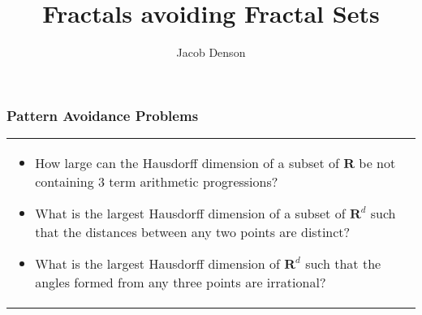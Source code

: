 \documentclass[usenames,dvipsnames]{beamer}
\title{Fractals avoiding Fractal Sets}
\author{Jacob Denson}
\institute{University of British Columbia}
\begin{document}
\maketitle

\begin{frame}
  \frametitle{Pattern Avoidance Problems}

\begin{tabular}{p{}p{}}

\begin{itemize}
     \item How large can the Hausdorff dimension of a subset of $\mathbf{R}$ be not containing 3 term arithmetic progressions?

     \item What is the largest Hausdorff dimension of a subset of $\mathbf{R}^d$ such that the distances between any two points are distinct?

     \item What is the largest Hausdorff dimension of $\mathbf{R}^d$ such that the angles formed from any three points are irrational?
\end{itemize}

\end{tabular}

\end{frame}
\end{document}
